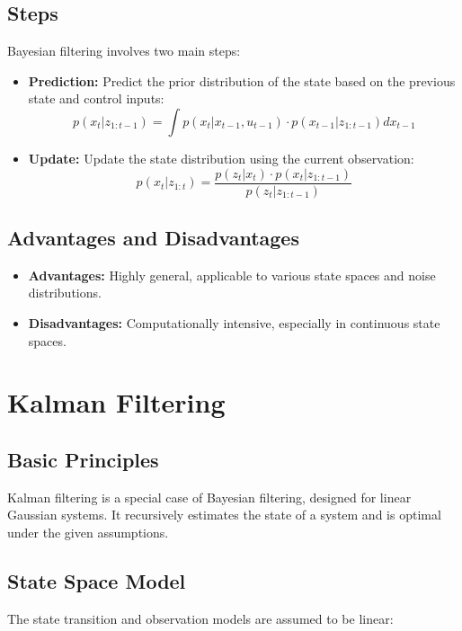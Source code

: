 \documentclass{article}
\begin{document}
\subsection{Steps}
Bayesian filtering involves two main steps:
\begin{itemize}
    \item \textbf{Prediction:} Predict the prior distribution of the state based on the previous state and control inputs:
    \begin{equation}
    p(x_t | z_{1:t-1}) = \int p(x_t | x_{t-1}, u_{t-1}) \cdot p(x_{t-1} | z_{1:t-1}) dx_{t-1}
    \end{equation}
    
    \item \textbf{Update:} Update the state distribution using the current observation:
    \begin{equation}
    p(x_t | z_{1:t}) = \frac{p(z_t | x_t) \cdot p(x_t | z_{1:t-1})}{p(z_t | z_{1:t-1})}
    \end{equation}
\end{itemize}

\subsection{Advantages and Disadvantages}
\begin{itemize}
    \item \textbf{Advantages:} Highly general, applicable to various state spaces and noise distributions.
    \item \textbf{Disadvantages:} Computationally intensive, especially in continuous state spaces.
\end{itemize}

\section{Kalman Filtering}

\subsection{Basic Principles}
Kalman filtering is a special case of Bayesian filtering, designed for linear Gaussian systems. It recursively estimates the state of a system and is optimal under the given assumptions.

\subsection{State Space Model}
The state transition and observation models are assumed to be linear:
\end{document}
